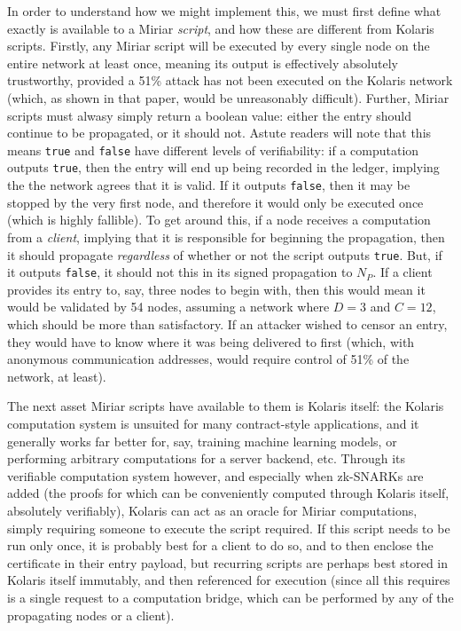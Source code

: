 \documentclass{extreport}
\begin{document}
In order to understand how we might implement this, we must first define what exactly is available to a Miriar \emph{script}, and how these are different from Kolaris scripts. Firstly, any Miriar script will be executed by every single node on the entire network at least once, meaning its output is effectively absolutely trustworthy, provided a 51\% attack has not been executed on the Kolaris network (which, as shown in that paper, would be unreasonably difficult). Further, Miriar scripts must alwasy simply return a boolean value: either the entry should continue to be propagated, or it should not. Astute readers will note that this means \texttt{true} and \texttt{false} have different levels of verifiability: if a computation outputs \texttt{true}, then the entry will end up being recorded in the ledger, implying the the network agrees that it is valid. If it outputs \texttt{false}, then it may be stopped by the very first node, and therefore it would only be executed once (which is highly fallible). To get around this, if a node receives a computation from a \emph{client}, implying that it is responsible for beginning the propagation, then it should propagate \emph{regardless} of whether or not the script outputs \texttt{true}. But, if it outputs \texttt{false}, it should not this in its signed propagation to \(N_P\). If a client provides its entry to, say, three nodes to begin with, then this would mean it would be validated by 54 nodes, assuming a network where \(D = 3\) and \(C = 12\), which should be more than satisfactory. If an attacker wished to censor an entry, they would have to know where it was being delivered to first (which, with anonymous communication addresses, would require control of 51\% of the network, at least).

The next asset Miriar scripts have available to them is Kolaris itself: the Kolaris computation system is unsuited for many contract-style applications, and it generally works far better for, say, training machine learning models, or performing arbitrary computations for a server backend, etc. Through its verifiable computation system however, and especially when zk-SNARKs are added (the proofs for which can be conveniently computed through Kolaris itself, absolutely verifiably), Kolaris can act as an oracle for Miriar computations, simply requiring someone to execute the script required. If this script needs to be run only once, it is probably best for a client to do so, and to then enclose the certificate in their entry payload, but recurring scripts are perhaps best stored in Kolaris itself immutably, and then referenced for execution (since all this requires is a single request to a computation bridge, which can be performed by any of the propagating nodes or a client).
\end{document}
